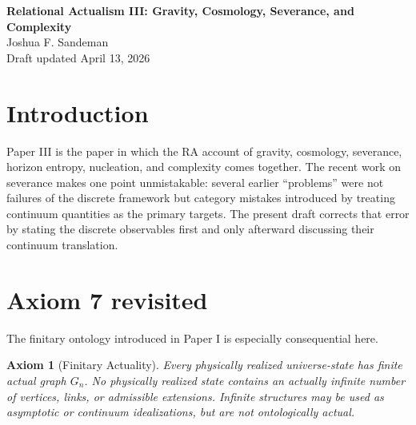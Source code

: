 \documentclass[11pt]{article}
\newtheorem{axiom}{Axiom}
\begin{document}
\begin{center}
{\LARGE \textbf{Relational Actualism III: Gravity, Cosmology, Severance, and Complexity}}\\[0.75em]
{\large Joshua F. Sandeman}\\[0.25em]
{\normalsize Draft updated April 13, 2026}
\end{center}

\begin{abstract}
This third paper develops the gravity, cosmology, severance, and complexity consequences of Relational Actualism. The present revision incorporates the recent severance results in full: the explicit axiom of Finitary Actuality, the choice of the RA-native entropy observable as severed-link count, the closure of the finiteness and interface-invariance parts of the entropy programme, and the correction of the ``area law'' into an intrinsically discrete boundary law. The paper therefore distinguishes sharply between discrete physics and continuum translation. The fundamental statement is not that entropy must first be shown to match continuum horizon area, but that severance entropy is proportional to intrinsic discrete boundary size. The comparison with Bekenstein-Hawking entropy is then a question about the BDG-to-metric dictionary.
\end{abstract}

\section{Introduction}
Paper III is the paper in which the RA account of gravity, cosmology, severance, horizon entropy, nucleation, and complexity comes together. The recent work on severance makes one point unmistakable: several earlier ``problems'' were not failures of the discrete framework but category mistakes introduced by treating continuum quantities as the primary targets. The present draft corrects that error by stating the discrete observables first and only afterward discussing their continuum translation.

\section{Axiom 7 revisited}
The finitary ontology introduced in Paper I is especially consequential here.

\begin{axiom}[Finitary Actuality]
Every physically realized universe-state has finite actual graph $G_n$. No physically realized state contains an actually infinite number of vertices, links, or admissible extensions. Infinite structures may be used as asymptotic or continuum idealizations, but are not ontologically actual.
\end{axiom}
\end{document}
